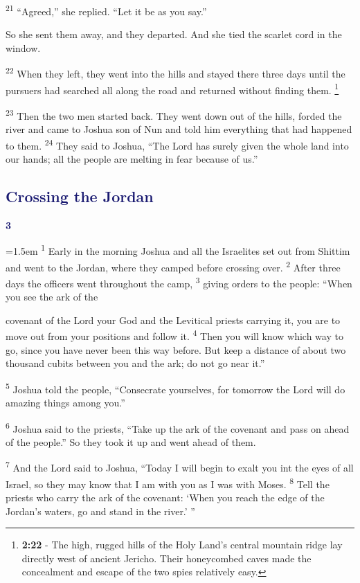 \documentclass[12pt,twoside]{article}
\newcommand{\vs}[1]{\textsuperscript{#1}}
\newcommand{\vnote}[2]{%
  \begingroup
  \renewcommand\thefootnote{}%
  \footnote{\scriptsize \textbf{}#2}%
  \addtocounter{footnote}{-1}%
  \endgroup
}
\newcommand{\chapterWithIndent}[2]{%
  \noindent
  \begin{minipage}[t]{1cm}
    \vspace{-0.4\baselineskip}
    {\textcolor{MidnightBlue}{\fontsize{40pt}{48pt}\selectfont \textbf{#1}}}
  \end{minipage}%
  \hspace{0.3cm}%
  \begin{minipage}[t]{\dimexpr\linewidth - 1.5cm - 0.3cm\relax}
    \hangindent=1.5em
    \hangafter=3
    #2
    \vspace{0.05cm}
  \end{minipage}
}
\begin{document}
\vs{21} ``Agreed,'' she replied. ``Let it be as you say.''

So she sent them away, and they departed. And she tied the scarlet cord in the window.

\vs{22} When they left, they went into the hills and stayed there three days until the pursuers had searched all along the road and returned without finding them.\vnote{22}{\textbf{2:22} - The high, rugged hills of the Holy Land’s central mountain ridge lay directly west of ancient Jericho. Their
honeycombed caves made the concealment and escape of the two spies relatively easy.}
\vs{23} Then the two men started back. They went down out of the hills, forded the river and came to Joshua son of Nun and told him everything that had happened to them.
\vs{24} They said to Joshua, ``The Lord has surely given the whole land into our hands; all the people are melting in fear because of us.''

\subsection*{\textcolor{MidnightBlue}{\textbf{Crossing the Jordan}}}

\chapterWithIndent{3}{%
  \vs{1} Early in the morning Joshua and all the Israelites set out from Shittim and went to the Jordan, where they camped before crossing over.
  \vs{2} After three days the officers went throughout the camp,
  \vs{3} giving orders to the people: “When you see the ark of the 
}

\noindent covenant of the Lord your God and the Levitical priests carrying it, you are to move out from your positions and follow it.
\vs{4} Then you will know which way to go, since you have never been this way before. But keep a distance of about two thousand cubits between you and the ark; do not go near it.''

\vs{5} Joshua told the people, ``Consecrate yourselves, for tomorrow the Lord will do amazing things among you.''

\vs{6} Joshua said to the priests, ``Take up the ark of the covenant and pass on ahead of the people.'' So they took it up and went ahead of them.

\vs{7} And the Lord said to Joshua, ``Today I will begin to exalt you int the eyes of all Israel, so they may know that I am with you as I was with Moses.
\vs{8} Tell the priests who carry the ark of the covenant: `When you reach the edge of the Jordan's waters, go and stand in the river.' ''
\end{document}
